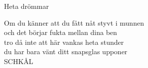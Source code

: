 \begin{song}{Heta drömmar}
	

	
	
	Om du känner att du fått nåt styvt i munnen\\
	och det börjar fukta mellan dina ben\\
	tro då inte att här vankas heta stunder\\
	du har bara vänt ditt snapsglas upponer\\
	SCHKÅL	
	
\end{song}
